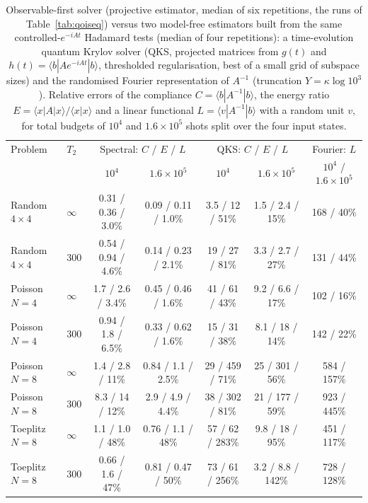 \documentclass[journal]{IEEEtran}
\begin{document}
\begin{table}[t]
\caption{Observable-first solver (projective estimator, median of six repetitions, the runs of Table~\ref{tab:qoiseq}) versus two model-free estimators built from the same controlled-$e^{-iAt}$ Hadamard tests (median of four repetitions): a time-evolution quantum Krylov solver (QKS, projected matrices from $g(t)$ and $h(t)=\langle b|Ae^{-iAt}|b\rangle$, thresholded regularisation, best of a small grid of subspace sizes) and the randomised Fourier representation of $A^{-1}$ (truncation $Y=\kappa\log10^3$). Relative errors of the compliance $C=\langle b|A^{-1}|b\rangle$, the energy ratio $E=\langle x|A|x\rangle/\langle x|x\rangle$ and a linear functional $L=\langle v|A^{-1}|b\rangle$ with a random unit $v$, for total budgets of $10^4$ and $1.6\times10^5$ shots split over the four input states.}
\label{tab:qoi}
\centering\footnotesize
\begin{tabular}{llccccc}
\toprule
Problem & $T_2$ & \multicolumn{2}{c}{Spectral: $C$ / $E$ / $L$} & \multicolumn{2}{c}{QKS: $C$ / $E$ / $L$} & Fourier: $L$\\
 & & $10^4$ & $1.6\times10^5$ & $10^4$ & $1.6\times10^5$ & $10^4$ / $1.6\times10^5$\\
\midrule
Random $4\times4$ & $\infty$ & 0.31 / 0.36 / 3.0\% & 0.09 / 0.11 / 1.0\% & 3.5 / 12 / 51\% & 1.5 / 2.4 / 15\% & 168 / 40\%\\
Random $4\times4$ & 300 & 0.54 / 0.94 / 4.6\% & 0.14 / 0.23 / 2.1\% & 19 / 27 / 81\% & 3.3 / 2.7 / 27\% & 131 / 44\%\\
Poisson $N=4$ & $\infty$ & 1.7 / 2.6 / 3.4\% & 0.45 / 0.46 / 1.6\% & 41 / 61 / 43\% & 9.2 / 6.6 / 17\% & 102 / 16\%\\
Poisson $N=4$ & 300 & 0.94 / 1.8 / 6.5\% & 0.33 / 0.62 / 1.6\% & 15 / 31 / 38\% & 8.1 / 18 / 14\% & 142 / 22\%\\
Poisson $N=8$ & $\infty$ & 1.4 / 2.8 / 11\% & 0.84 / 1.1 / 2.5\% & 29 / 459 / 71\% & 25 / 301 / 56\% & 584 / 157\%\\
Poisson $N=8$ & 300 & 8.3 / 14 / 12\% & 2.9 / 4.9 / 4.4\% & 38 / 302 / 81\% & 21 / 177 / 59\% & 923 / 445\%\\
Toeplitz $N=8$ & $\infty$ & 1.1 / 1.0 / 48\% & 0.76 / 1.1 / 48\% & 57 / 62 / 283\% & 9.8 / 18 / 95\% & 451 / 117\%\\
Toeplitz $N=8$ & 300 & 0.66 / 1.6 / 47\% & 0.81 / 0.47 / 50\% & 73 / 61 / 256\% & 3.2 / 8.8 / 142\% & 728 / 128\%\\
\bottomrule
\end{tabular}
\end{table}
\end{document}
